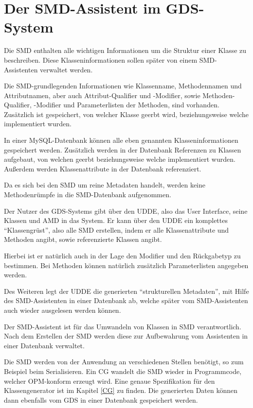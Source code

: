 \section{Der SMD-Assistent im GDS-System} \label{SMD-Assistent}
Die \ac{SMD} enthalten alle wichtigen Informationen um die Struktur einer Klasse zu beschreiben. Diese Klasseninformationen sollen sp\"ater von einem SMD-Assistenten verwaltet werden.

Die \ac{SMD}-grundlegenden Informationen wie Klassenname, Methodennamen und Attributnamen, aber auch Attribut-Qualifier und -Modifier, sowie Methoden-Qualifier, -Modifier und Parameterlisten der Methoden, sind vorhanden.
Zus\"atzlich ist gespeichert, von welcher Klasse geerbt wird, beziehungsweise welche implementiert wurden.

In einer MySQL-Datenbank k\"onnen alle eben genannten Klasseninformationen gespeichert werden. Zus\"atzlich werden in der Datenbank Referenzen zu Klassen aufgebaut, von welchen geerbt beziehungsweise welche implementiert wurden.
Au\ss{}erdem werden Klassenattribute in der Datenbank referenziert. \cite{Zil14}

Da es sich bei den \ac{SMD} um reine Metadaten handelt, werden keine Methodenr\"umpfe in die \ac{SMD}-Datenbank aufgenommen.

Der Nutzer des \ac{GDS}-Systems gibt \"uber den \ac{UDDE}, also das User Interface, seine Klassen und \ac{AMD} in das System. Er kann \"uber den \ac{UDDE} ein komplettes "`Klassengr\"ust"', also alle \ac{SMD} erstellen, indem er alle Klassenattribute und Methoden angibt, sowie referenzierte Klassen angibt. 

Hierbei ist er nat\"urlich auch in der Lage den Modifier und den R\"uckgabetyp zu bestimmen. Bei Methoden k\"onnen nat\"urlich zus\"atzlich Parameterlisten angegeben werden.

Des Weiteren legt der \ac{UDDE} die generierten "`strukturellen Metadaten"', mit Hilfe des \ac{SMD}-Assistenten in einer Datenbank ab, welche sp\"ater vom SMD-Assistenten auch wieder ausgelesen werden k\"onnen.

Der SMD-Assistent ist f\"ur das Umwandeln von Klassen in \ac{SMD} verantwortlich. Nach dem Erstellen der \ac{SMD} werden diese zur Aufbewahrung vom Assistenten in einer Datenbank verwaltet.

Die \ac{SMD} werden von der Anwendung an verschiedenen Stellen ben\"otigt, so zum Beispiel beim Serialisieren. Ein \ac{CG} wandelt die \ac{SMD} wieder in Programmcode, welcher \ac{OPM}-konform erzeugt wird. Eine genaue Spezifikation f\"ur den Klassengenerator ist im Kapitel \ref{CG} zu finden.
Die generierten Daten k\"onnen dann ebenfalls vom \ac{GDS} in einer Datenbank gespeichert werden.

